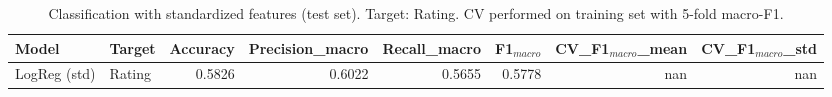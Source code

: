 \begin{table}[t]
\centering
\begin{tabular}{llrrrrrr}
\toprule
Model & Target & Accuracy & Precision_macro & Recall_macro & F1$_{macro}$ & CV_F1$_{macro}$_mean & CV_F1$_{macro}$_std \\
\midrule
LogReg (std) & Rating & 0.5826 & 0.6022 & 0.5655 & 0.5778 & nan & nan \\
\bottomrule
\end{tabular}
\caption{Classification with standardized features (test set). Target: Rating. CV performed on training set with 5-fold macro-F1.}
\label{tab:auto_classification_results}
\end{table}